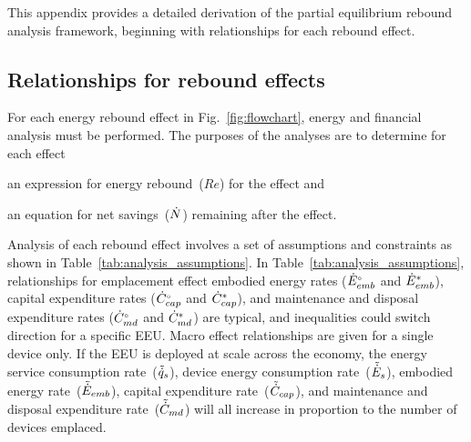 

This appendix provides a detailed derivation of 
the partial equilibrium rebound analysis framework,
beginning with relationships for each rebound effect.


\subsection{Relationships for rebound effects}
\label{sec:relationships_for_stages}

For each energy rebound effect in Fig.~\ref{fig:flowchart},
energy and financial analysis must be performed.
The purposes of the analyses are to determine for each effect
%
\begin{enumerate*}[label={(\roman*)}]

  \item an expression for energy rebound~($Re$) for the effect and

  \item an equation for net savings~($\dot{N}$) remaining after the effect.

\end{enumerate*}

Analysis of each rebound effect
involves a set of assumptions and constraints
as shown in Table~\ref{tab:analysis_assumptions}.
In Table~\ref{tab:analysis_assumptions}, 
relationships for emplacement effect 
embodied energy rates (${}{\dot{E}}^{\scriptscriptstyle \circ}_{emb}$ and ${\dot{E}}^*_{emb}$), 
capital expenditure rates (${}{\dot{C}}^{\scriptscriptstyle \circ}_{cap}$ and ${\dot{C}}^*_{cap}$), and 
maintenance and disposal expenditure rates (${}{\dot{C}}^{\scriptscriptstyle \circ}_{md}$ and ${\dot{C}}^*_{md}$)
are typical, and
inequalities could switch direction for a specific EEU.
Macro effect relationships are given for a single device only.
If the EEU is deployed at scale across the economy, 
the energy service consumption rate~($\tilde{\dot{q}}_s$), 
device energy consumption rate~($\tilde{\dot{E}}_s$), 
embodied energy rate~($\tilde{\dot{E}}_{emb}$),
capital expenditure rate~($\tilde{\dot{C}}_{cap}$), and 
maintenance and disposal expenditure rate~($\tilde{\dot{C}}_{md}$)
will all increase in proportion to the number of devices emplaced.




